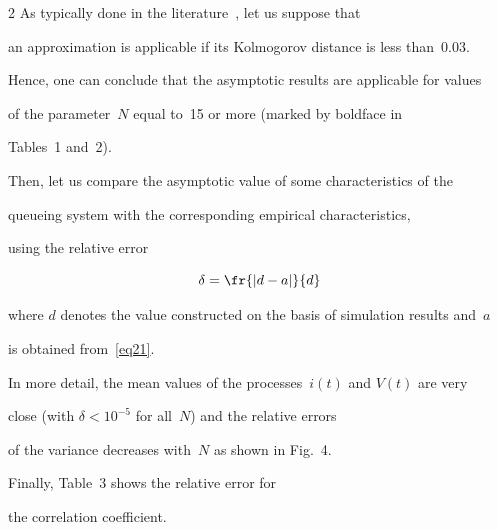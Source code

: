 \begin{multicols}{2}
As typically done in the literature~\cite{lit6}, let us suppose that 


an approximation is applicable if its Kolmogorov distance is less than~0.03. 


Hence, one can  conclude that the asymptotic results are applicable for values


 of the parameter~$N$ equal to~15 or more (marked by boldface in 


 Tables~1 and~2).


 











Then, let us compare the asymptotic value of some characteristics of the 


queueing system with the corresponding empirical characteristics, 


using the relative error


$$


\delta=\fr{\left| d-a\right| }{d}


$$


where $d$ denotes the value constructed on the basis of simulation results and~$a$ 


is obtained from~\eqref{eq21}.





In more detail, the mean values of the processes~$i(t)$ and $V(t)$ are very


 close (with $\delta<10^{-5}$ for all~$N$) and the relative errors 


 of the variance decreases with~$N$ as shown in Fig.~4.











Finally, Table~3 shows the relative error for 


the correlation coefficient.





\vspace*{12pt}







\begin{center}



\end{center}
\end{multicols}
